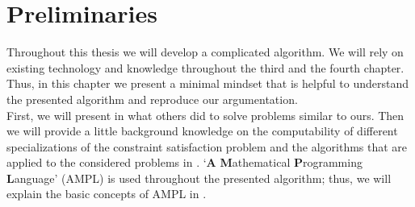 \chapter{Preliminaries}
\label{chap:preliminaries}
Throughout this thesis we will develop a complicated algorithm. We will rely on existing technology and knowledge throughout the third and the fourth chapter. Thus, in this chapter we present a minimal mindset that is helpful to understand the presented algorithm and reproduce our argumentation. \\
First, we will present in  what others did to solve problems similar to ours.
Then we will provide a little background knowledge on the computability of different specializations of the constraint satisfaction problem and the algorithms that are applied to the considered problems in . 
`\textbf{A} \textbf{M}athematical \textbf{P}rogramming \textbf{L}anguage' (AMPL) is used throughout the presented algorithm; thus, we will explain the basic concepts of AMPL in . 
